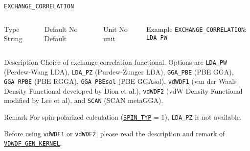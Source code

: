 \documentclass[xcolor=dvipsnames,t]{beamer}
\begin{document}
\begin{frame}[allowframebreaks]{\texttt{EXCHANGE\_CORRELATION}} \label{EXCHANGE_CORRELATION}
\vspace*{-12pt}
\begin{columns}
\begin{block}{Type}
String
\end{block}

\begin{block}{Default}
No Default
\end{block}

\begin{block}{Unit}
No unit
\end{block}

\begin{block}{Example}
\texttt{EXCHANGE\_CORRELATION}: \texttt{LDA\_PW}
\end{block}
\end{columns}

\begin{block}{Description}
Choice of exchange-correlation functional. Options are \texttt{LDA\_PW} (Perdew-Wang LDA), \texttt{LDA\_PZ} (Purdew-Zunger LDA), \texttt{GGA\_PBE} (PBE GGA), \texttt{GGA\_RPBE} (PBE RGGA), \texttt{GGA\_PBEsol} (PBE GGAsol), \texttt{vdWDF1} (van der Waals Density Functional developed by Dion et al.), \texttt{vdWDF2} (vdW Density Functional modified by Lee et al), and \texttt{SCAN} (SCAN metaGGA).
\end{block}

\begin{block}{Remark}
For spin-polarized calculation (\hyperlink{SPIN_TYP}{\texttt{SPIN\_TYP}} = 1), \texttt{LDA\_PZ} is not available.

Before using \texttt{vdWDF1} or \texttt{vdWDF2}, please read the description and remark of \hyperlink{VDWDF_GEN_KERNEL}{\texttt{VDWDF\_GEN\_KERNEL}}.
\end{block}

\end{frame}
\end{document}
